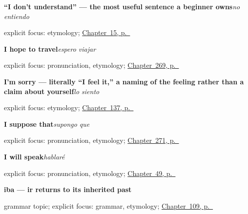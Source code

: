 \noindent\begin{minipage}[t]{\linewidth}
\raggedright
\textbf{\textquotedblleft{}I don't understand\textquotedblright{} — the most useful sentence a beginner owns}\enspace\emph{no entiendo}\par
\footnotesize explicit focus: etymology; \hyperref[ch:repair]{Chapter~15, p.~\pageref*{ch:repair}}
\end{minipage}\par\smallskip

\noindent\begin{minipage}[t]{\linewidth}
\raggedright
\textbf{I hope to travel}\enspace\emph{espero viajar}\par
\footnotesize explicit focus: pronunciation, etymology; \hyperref[ch:experiencia]{Chapter~269, p.~\pageref*{ch:experiencia}}
\end{minipage}\par\smallskip

\noindent\begin{minipage}[t]{\linewidth}
\raggedright
\textbf{I'm sorry — literally \textquotedblleft{}I feel it,\textquotedblright{} a naming of the feeling rather than a claim about yourself}\enspace\emph{lo siento}\par
\footnotesize explicit focus: etymology; \hyperref[ch:spanish-sorry]{Chapter~137, p.~\pageref*{ch:spanish-sorry}}
\end{minipage}\par\smallskip

\noindent\begin{minipage}[t]{\linewidth}
\raggedright
\textbf{I suppose that}\enspace\emph{supongo que}\par
\footnotesize explicit focus: pronunciation, etymology; \hyperref[ch:ideas]{Chapter~271, p.~\pageref*{ch:ideas}}
\end{minipage}\par\smallskip

\noindent\begin{minipage}[t]{\linewidth}
\raggedright
\textbf{I will speak}\enspace\emph{hablaré}\par
\footnotesize explicit focus: pronunciation, etymology; \hyperref[ch:ir-y-futuro]{Chapter~49, p.~\pageref*{ch:ir-y-futuro}}
\end{minipage}\par\smallskip

\noindent\begin{minipage}[t]{\linewidth}
\raggedright
\textbf{iba — ir returns to its inherited past}\par
\footnotesize grammar topic; explicit focus: grammar, etymology; \hyperref[ch:spanish-imperfecto-irregulares]{Chapter~109, p.~\pageref*{ch:spanish-imperfecto-irregulares}}
\end{minipage}\par\smallskip

